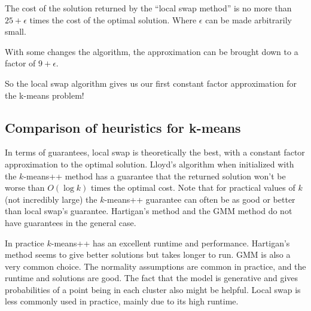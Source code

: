 \begin{theorem}
  The cost of the solution returned by the ``local swap method'' is no more than $25+\epsilon$ times the cost of the optimal solution.
  Where $\epsilon$ can be made arbitrarily small.
\end{theorem}
\begin{fact}
  With some changes the algorithm, the approximation can be brought down to a factor of $9+ \epsilon$.
\end{fact}

So the local swap algorithm gives us our first constant factor approximation for the k-means problem!

\subsection{Comparison of heuristics for k-means}
In terms of guarantees, local swap is theoretically the best, with a constant factor approximation to the optimal solution. 
Lloyd's algorithm when initialized with the $k$-means++ method has a guarantee that the returned solution won't be worse than $O(\log k)$ times the optimal cost.
Note that for practical values of $k$ (not incredibly large) the $k$-means++ guarantee can often be as good or better than local swap's guarantee. 
Hartigan's method and the GMM method do not have guarantees in the general case.

In practice $k$-means++ has an excellent runtime and performance. Hartigan's method seems to give better solutions but takes longer to run. 
GMM is also a very common  choice. The normality assumptions are common in practice, and the runtime and solutions are good. The fact that the model is generative 
and gives probabilities of a point being in each cluster also might be helpful. Local swap is less commonly used in practice, 
mainly due to its high runtime.
	
